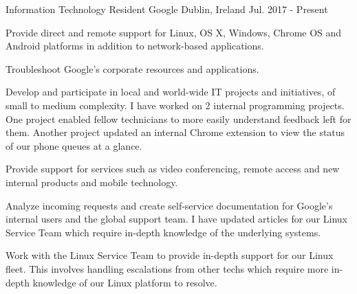 

\begin{cventries}

  \cventry
    {Information Technology Resident} %
    {Google} %
    {Dublin, Ireland} %
    {Jul. 2017 - Present} %
    {
      \begin{cvitems} %
        \item {Provide direct and remote support for Linux, OS X, Windows, Chrome OS and Android platforms in addition to network-based applications.}
        \item {Troubleshoot Google’s corporate resources and applications.}
        \item {Develop and participate in local and world-wide IT projects and initiatives, of small to medium complexity. I have worked on 2 internal programming projects. One project enabled fellow technicians to more easily understand feedback left for them. Another project updated an internal Chrome extension to view the status of our phone queues at a glance.}
        \item {Provide support for services such as video conferencing, remote access and new internal products and mobile technology.}
        \item {Analyze incoming requests and create self-service documentation for Google’s internal users and the global support team. I have updated articles for our Linux Service Team which require in-depth knowledge of the underlying systems.}
	\item{Work with the Linux Service Team to provide in-depth support for our Linux fleet. This involves handling escalations from other techs which require more in-depth knowledge of our Linux platform to resolve.} 
      \end{cvitems}
    }
 

\end{cventries}
